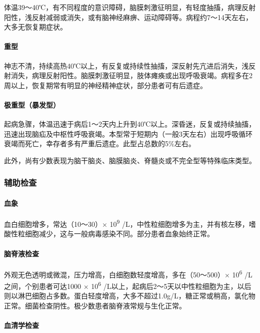 体温39～40℃，有不同程度的意识障碍，脑膜刺激征明显，有轻度抽搐，病理反射阳性，浅反射减弱或消失，或有脑神经麻痹、运动障碍等。病程约7～14天左右，大多无恢复期症状。

\paragraph{重型}

神志不清，持续高热40℃以上，有反复或持续性抽搐，深反射先亢进后消失，浅反射消失，病理反射阳性。脑膜刺激征明显，肢体瘫痪或出现呼吸衰竭。病程多在2周以上，恢复期常有明显的神经精神症状，部分患者可有后遗症。

\paragraph{极重型（暴发型）}

起病急骤，体温迅速于病后1～2天内上升到40℃以上。深昏迷，反复或持续抽搐，迅速出现脑疝及中枢性呼吸衰竭。本型常于短期内（一般3天左右）出现呼吸循环衰竭而死亡，幸存者多有严重后遗症。此型占总数的5\%左右。

此外，尚有少数表现为脑干脑炎、脑膜脑炎、脊髓炎或不完全型等特殊临床类型。

\subsubsection{辅助检查}

\paragraph{血象}

血白细胞增多，常达（10～30）× 10\textsuperscript{9}
/L，中性粒细胞增多为主，并有核左移，嗜酸性粒细胞减少，这与一般病毒感染不同。部分患者血象始终正常。

\paragraph{脑脊液检查}

外观无色透明或微混，压力增高，白细胞数轻度增高，多在（50～500）×
10\textsuperscript{6} /L之间，个别患者可达1000 × 10\textsuperscript{6}
/L以上，起病后2～5天以中性粒细胞为主，以后则以淋巴细胞占多数。蛋白轻度增高，大多不超过1.0g/L，糖正常或稍高，氯化物正常。细菌检查阴性。极少数患者脑脊液常规与生化正常。

\paragraph{血清学检查}

